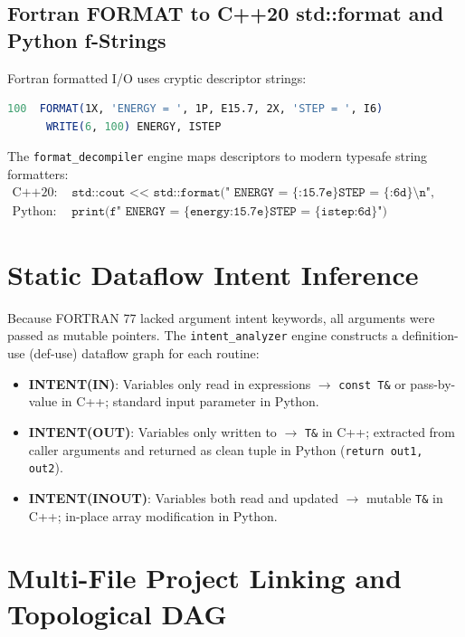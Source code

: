 \documentclass[11pt,a4paper]{article}
\theoremstyle{definition}
\begin{document}
\subsection{Fortran FORMAT to C++20 std::format and Python f-Strings}
Fortran formatted I/O uses cryptic descriptor strings:
\begin{lstlisting}[language=Fortran]
 100  FORMAT(1X, 'ENERGY = ', 1P, E15.7, 2X, 'STEP = ', I6)
      WRITE(6, 100) ENERGY, ISTEP
\end{lstlisting}
The \texttt{format\_decompiler} engine maps descriptors to modern typesafe string formatters:
\begin{align}
    \text{C++20: } & \texttt{std::cout << std::format(" ENERGY = \{:15.7e\}  STEP = \{:6d\}\textbackslash n", energy, istep);} \\
    \text{Python: } & \texttt{print(f" ENERGY = \{energy:15.7e\}  STEP = \{istep:6d\}")}
\end{align}

\section{Static Dataflow Intent Inference}

Because FORTRAN 77 lacked argument intent keywords, all arguments were passed as mutable pointers. The \texttt{intent\_analyzer} engine constructs a definition-use (def-use) dataflow graph for each routine:
\begin{itemize}
    \item \textbf{INTENT(IN)}: Variables only read in expressions $\longrightarrow$ \texttt{const T\&} or pass-by-value in C++; standard input parameter in Python.
    \item \textbf{INTENT(OUT)}: Variables only written to $\longrightarrow$ \texttt{T\&} in C++; extracted from caller arguments and returned as clean tuple in Python (\texttt{return out1, out2}).
    \item \textbf{INTENT(INOUT)}: Variables both read and updated $\longrightarrow$ mutable \texttt{T\&} in C++; in-place array modification in Python.
\end{itemize}

\section{Multi-File Project Linking and Topological DAG}
\end{document}
